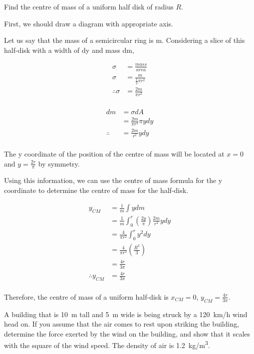 \question Find the centre of mass of a uniform half disk of radius $R$.
\begin{solution}
First, we should draw a diagram with appropriate axis.


Let us say that the mass of a semicircular ring is m. Considering a slice of this half-disk with a width of dy and mass dm,

\begin{align*}
\sigma &=\frac{mass}{area} \\
\sigma &=\frac{m}{\frac{1}{2}\pi r^{2}} \\
\therefore \sigma &=\frac{2m}{\pi r^{2}} \\
\end{align*}

\begin{align*}
dm&=\sigma dA\\
&=\frac{2m}{\pi r^{2}}\pi ydy\\
\therefore&=\frac{2m}{r^{2}} ydy\\
\end{align*}

The y coordinate of the position of the centre of mass will be located at $x=0$ and $y=\frac{2r}{\pi}$ by symmetry.

Using this information, we can use the centre of mass formula for the y coordinate to determine the centre of mass for the half-disk.

\begin{align*}
y_{CM}&=\frac{1}{m}\int y dm\\
&=\frac{1}{m}\int_{0}^{r} (\frac{2y}{\pi})\frac{2m}{r^{2}}ydy\\
&=\frac{4}{\pi r^{2}}\int_{0}^{r}y^{2}dy\\
&=\frac{4}{\pi r^{2}}(\frac{R^{3}}{3})\\
&=\frac{4r}{3\pi}\\
\therefore y_{CM}&=\frac{4r}{3\pi}\\
\end{align*}

Therefore, the centre of mass of a uniform half-disk is $x_{CM}=0$, $y_{CM}=\frac{4r}{3\pi}$.
\end{solution}


\question A building that is \SI{10}{m} tall and \SI{5}{m} wide is being struck by a \SI{120}{km/h} wind head on. If you assume that the air comes to rest upon striking the building, determine the force exerted by the wind on the building, and show that it scales with the square of the wind speed. The density of air is \SI{1.2}{kg/m^3}.

